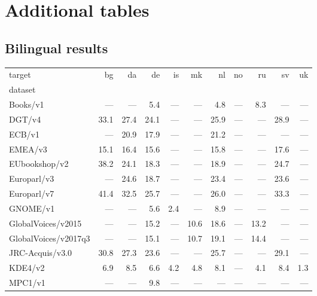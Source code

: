 \section{Additional tables}

\subsection{Bilingual results}

\begin{table}[h]
\begin{tabular}{lrrrrrrrrrr}
\toprule
target &   bg &   da &   de &   is &   mk &   nl &   no &   ru &   sv &   uk \\
dataset              &      &      &      &      &      &      &      &      &      &      \\
\midrule
Books/v1             &  --- &  --- &  5.4 &  --- &  --- &  4.8 &  --- &  8.3 &  --- &  --- \\
DGT/v4               & 33.1 & 27.4 & 24.1 &  --- &  --- & 25.9 &  --- &  --- & 28.9 &  --- \\
ECB/v1               &  --- & 20.9 & 17.9 &  --- &  --- & 21.2 &  --- &  --- &  --- &  --- \\
EMEA/v3              & 15.1 & 16.4 & 15.6 &  --- &  --- & 15.8 &  --- &  --- & 17.6 &  --- \\
EUbookshop/v2        & 38.2 & 24.1 & 18.3 &  --- &  --- & 18.9 &  --- &  --- & 24.7 &  --- \\
Europarl/v3          &  --- & 24.6 & 18.7 &  --- &  --- & 23.4 &  --- &  --- & 23.6 &  --- \\
Europarl/v7          & 41.4 & 32.5 & 25.7 &  --- &  --- & 26.0 &  --- &  --- & 33.3 &  --- \\
GNOME/v1             &  --- &  --- &  5.6 &  2.4 &  --- &  8.9 &  --- &  --- &  --- &  --- \\
GlobalVoices/v2015   &  --- &  --- & 15.2 &  --- & 10.6 & 18.6 &  --- & 13.2 &  --- &  --- \\
GlobalVoices/v2017q3 &  --- &  --- & 15.1 &  --- & 10.7 & 19.1 &  --- & 14.4 &  --- &  --- \\
JRC-Acquis/v3.0      & 30.8 & 27.3 & 23.6 &  --- &  --- & 25.7 &  --- &  --- & 29.1 &  --- \\
KDE4/v2              &  6.9 &  8.5 &  6.6 &  4.2 &  4.8 &  8.1 &  --- &  4.1 &  8.4 &  1.3 \\
MPC1/v1              &  --- &  --- &  9.8 &  --- &  --- &  --- &  --- &  --- &  --- &  --- \\

\end{tabular}
\end{table}
